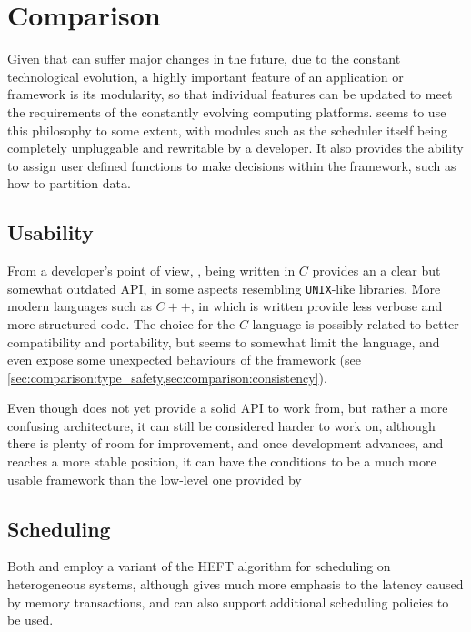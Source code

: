 \documentclass[main.tex]{subfiles}
\begin{document}
\section{Comparison} \label{sec:comparison}

Given that \hetplats can suffer major changes in the future, due to the constant technological evolution, a highly important feature of an application or framework is its modularity, so that individual features can be updated to meet the requirements of the constantly evolving computing platforms. \starpu seems to use this philosophy to some extent, with modules such as the scheduler itself being completely unpluggable and rewritable by a developer. It also provides the ability to assign user defined functions to make decisions within the framework, such as how to partition data.

\subsection{Usability}

From a developer's point of view, \starpu, being written in $C$ provides an a clear but somewhat outdated API, in some aspects resembling \texttt{UNIX}-like libraries. More modern languages such as $C++$, in which \gama is written provide less verbose and more structured code. The choice for the $C$ language is possibly related to better compatibility and portability, but seems to somewhat limit the language, and even expose some unexpected behaviours of the framework (see \cref{sec:comparison:type_safety,sec:comparison:consistency}).

Even though \gama does not yet provide a solid API to work from, but rather a more confusing architecture, it can still be considered harder to work on, although there is plenty of room for improvement, and once development advances, and reaches a more stable position, it can have the conditions to be a much more usable framework than the low-level one provided by \starpu

\subsection{Scheduling}

Both \starpu and \gama employ a variant of the \acs{HEFT} algorithm for scheduling on heterogeneous systems, although \starpu gives much more emphasis to the latency caused by memory transactions, and can also support additional scheduling policies to be used.
\end{document}
